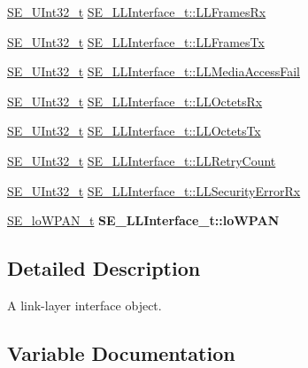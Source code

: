 \begin{DoxyCompactItemize}
\item 
\hyperlink{group__UInt32_ga70bd4ecda3c0c85d20779d685a270cdb}{S\+E\+\_\+\+U\+Int32\+\_\+t} \hyperlink{group__LLInterface_ga90c38987e2ab44715a8f858b2cb16fcc}{S\+E\+\_\+\+L\+L\+Interface\+\_\+t\+::\+L\+L\+Frames\+Rx}
\item 
\hyperlink{group__UInt32_ga70bd4ecda3c0c85d20779d685a270cdb}{S\+E\+\_\+\+U\+Int32\+\_\+t} \hyperlink{group__LLInterface_ga85a2342a247104a6ad9cbf1b0453dea2}{S\+E\+\_\+\+L\+L\+Interface\+\_\+t\+::\+L\+L\+Frames\+Tx}
\item 
\hyperlink{group__UInt32_ga70bd4ecda3c0c85d20779d685a270cdb}{S\+E\+\_\+\+U\+Int32\+\_\+t} \hyperlink{group__LLInterface_ga50e029d2042a334b98066e875e95879d}{S\+E\+\_\+\+L\+L\+Interface\+\_\+t\+::\+L\+L\+Media\+Access\+Fail}
\item 
\hyperlink{group__UInt32_ga70bd4ecda3c0c85d20779d685a270cdb}{S\+E\+\_\+\+U\+Int32\+\_\+t} \hyperlink{group__LLInterface_ga84ccf99bfd9658ce936851fdb77870b0}{S\+E\+\_\+\+L\+L\+Interface\+\_\+t\+::\+L\+L\+Octets\+Rx}
\item 
\hyperlink{group__UInt32_ga70bd4ecda3c0c85d20779d685a270cdb}{S\+E\+\_\+\+U\+Int32\+\_\+t} \hyperlink{group__LLInterface_gaf066ed5c9c829bca58631b4f14037851}{S\+E\+\_\+\+L\+L\+Interface\+\_\+t\+::\+L\+L\+Octets\+Tx}
\item 
\hyperlink{group__UInt32_ga70bd4ecda3c0c85d20779d685a270cdb}{S\+E\+\_\+\+U\+Int32\+\_\+t} \hyperlink{group__LLInterface_gad89a03017476955c94cc21ad73dfc140}{S\+E\+\_\+\+L\+L\+Interface\+\_\+t\+::\+L\+L\+Retry\+Count}
\item 
\hyperlink{group__UInt32_ga70bd4ecda3c0c85d20779d685a270cdb}{S\+E\+\_\+\+U\+Int32\+\_\+t} \hyperlink{group__LLInterface_ga2ddb6e5f1bdcd13ad802cc379bd0f29e}{S\+E\+\_\+\+L\+L\+Interface\+\_\+t\+::\+L\+L\+Security\+Error\+Rx}
\item 
\mbox{\label{group__LLInterface_ga13b2319fee4bd774eaa4ebe6b0957ec4}} 
\hyperlink{structSE__loWPAN__t}{S\+E\+\_\+lo\+W\+P\+A\+N\+\_\+t} {\bfseries S\+E\+\_\+\+L\+L\+Interface\+\_\+t\+::lo\+W\+P\+AN}
\end{DoxyCompactItemize}


\subsection{Detailed Description}
A link-\/layer interface object. 

\subsection{Variable Documentation}
\mbox{\label{group__LLInterface_gaa0dc55efd407aa5396ed13e3a59692a7}} 
